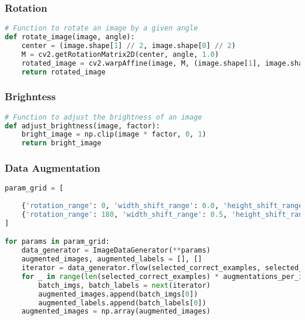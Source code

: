 \documentclass{article}
\begin{document}
\subsubsection{Rotation} 
\begin{lstlisting}[language=Python, caption=Image Processing Functions]
# Function to rotate an image by a given angle
def rotate_image(image, angle):
    center = (image.shape[1] // 2, image.shape[0] // 2)
    M = cv2.getRotationMatrix2D(center, angle, 1.0)
    rotated_image = cv2.warpAffine(image, M, (image.shape[1], image.shape[0]))
    return rotated_image

\end{lstlisting}
\subsubsection{Brighntess} 

\begin{lstlisting}[language=Python, caption=Image Processing Functions]
# Function to adjust the brightness of an image
def adjust_brightness(image, factor):
    bright_image = np.clip(image * factor, 0, 1)
    return bright_image
\end{lstlisting}


\subsubsection{Data Augmentation}
\begin{lstlisting}[language=Python, caption=Experimenting with Image Augmentations]
param_grid = [
   
    {'rotation_range': 0, 'width_shift_range': 0.0, 'height_shift_range': 0.0, 'shear_range': 0.0, 'zoom_range': 0.0, 'horizontal_flip': False},
    {'rotation_range': 180, 'width_shift_range': 0.5, 'height_shift_range': 0.5, 'shear_range': 0.5, 'zoom_range': 0.5, 'horizontal_flip': True}
]

for params in param_grid:
    data_generator = ImageDataGenerator(**params)
    augmented_images, augmented_labels = [], []
    iterator = data_generator.flow(selected_correct_examples, selected_labels, batch_size=1)
    for _ in range(len(selected_correct_examples) * augmentations_per_image):
        batch_imgs, batch_labels = next(iterator)
        augmented_images.append(batch_imgs[0])
        augmented_labels.append(batch_labels[0])
    augmented_images = np.array(augmented_images)
\end{lstlisting}
\end{document}
